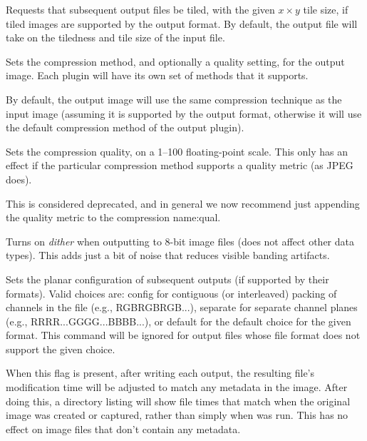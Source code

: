 \label{sec:oiiotool:tile}
Requests that subsequent output files be tiled, with the given $x \times y$ 
tile size, if tiled images are supported by the output format.
By default, the output file will take on the tiledness and tile size
of the input file.
\apiend

Sets the compression method, and optionally a quality setting, for the
output image.  Each \ImageOutput plugin will have its own set of methods
that it supports.

By default, the output image will use the same compression technique as
the input image (assuming it is supported by the output format,
otherwise it will use the default compression method of the output
plugin).
\apiend

Sets the compression quality, on a 1--100 floating-point scale.
This only has an effect if the particular compression method supports
a quality metric (as JPEG does).

This is considered deprecated, and in general we now recommend just
appending the quality metric to the {\cf compression name:qual}.
\apiend

Turns on \emph{dither} when outputting to 8-bit image files (does not affect
other data types). This adds just a bit of noise that reduces visible
banding artifacts.
\apiend

Sets the planar configuration of subsequent outputs (if supported by
their formats).  Valid choices are: {\cf config} for contiguous (or
interleaved) packing of channels in the file (e.g., RGBRGBRGB...), 
{\cf separate} for separate channel planes (e.g.,
RRRR...GGGG...BBBB...), or {\cf default} for the default choice for the
given format.  This command will be ignored for output files whose 
file format does not support the given choice.
\apiend

When this flag is present, after writing each output, the resulting
file's modification time will be adjusted to match any 
metadata in the image.  After doing this, a directory listing will show
file times that match when the original image was created or captured,
rather than simply when \oiiotool was run.  This has no effect on
image files that don't contain any  metadata.
\apiend

